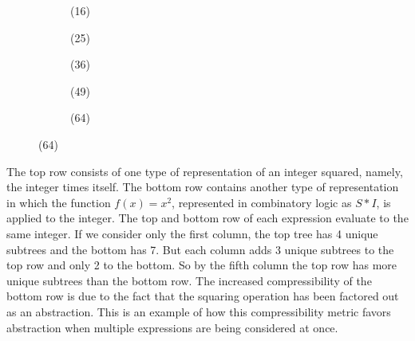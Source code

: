 \documentclass{article}
\begin{document}
\begin{figure}[h!]
  \vspace{2mm}
  \begin{subfigure}{.17\linewidth}
     \caption{(16)}
  \end{subfigure}
  \begin{subfigure}{.17\linewidth}
     \caption{(25)}
  \end{subfigure}
   \begin{subfigure}{.17\linewidth}
     \caption{(36)}
  \end{subfigure}
  \begin{subfigure}{.17\linewidth}
     \caption{(49)}
  \end{subfigure}
  \begin{subfigure}{.17\linewidth}
     \caption{(64)}
  \end{subfigure}
\end{figure}
\captionsetup[subfigure]{labelformat=parens} 
\vspace{-.3cm}

\noindent The top row consists of one type of representation of an integer
squared, namely, the integer times itself. The bottom row contains
another type of representation in which the function $f(x)=x^2$,
represented in combinatory logic as $S * I$, is applied to the
integer. The top and bottom row of each expression evaluate to the
same integer. If we consider only the first column, the top tree has 4
unique subtrees and the bottom has 7. But each column adds 3 unique
subtrees to the top row and only 2 to the bottom. So by the fifth
column the top row has more unique subtrees than the bottom row. The
increased compressibility of the bottom row is due to the fact that
the squaring operation has been factored out as an abstraction. This
is an example of how this compressibility metric favors
abstraction when multiple expressions are being considered at once.
\end{document}
